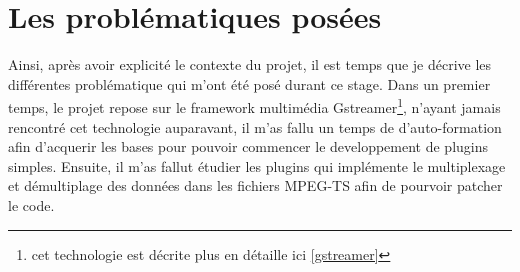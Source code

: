 \chapter{Les problématiques posées}
Ainsi, après avoir explicité le contexte du projet, il est temps que je décrive les différentes problématique qui m'ont été posé durant ce stage. Dans un premier temps, le projet repose sur le framework multimédia Gstreamer\footnote{cet technologie est décrite plus en détaille ici \ref{gstreamer}}, n'ayant jamais rencontré cet technologie auparavant, il m'as fallu un temps de d'auto-formation afin d'acquerir les bases pour pouvoir commencer le developpement de plugins simples. Ensuite, il m'as fallut étudier les plugins qui implémente le multiplexage et démultiplage des données dans les fichiers MPEG-TS afin de pourvoir patcher le code.